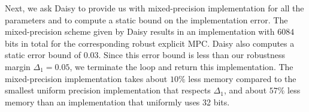 
Next, we ask Daisy to provide us with mixed-precision implementation for all the parameters and to compute a static bound on the
implementation error. 
The mixed-precision scheme given by Daisy results in an implementation with $6084$ bits in total 
for the corresponding robust explicit MPC.
Daisy also computes a static error bound of $0.03$.
Since this error bound is less than our robustness margin $\Delta_1 = 0.05$, we terminate the loop
and return this implementation.
The mixed-precision implementation takes about $10\%$ less memory compared 
to the smallest uniform precision implementation that respects $\Delta_1$,
and about $57\%$ less memory than an implementation that uniformly uses
32 bits.


